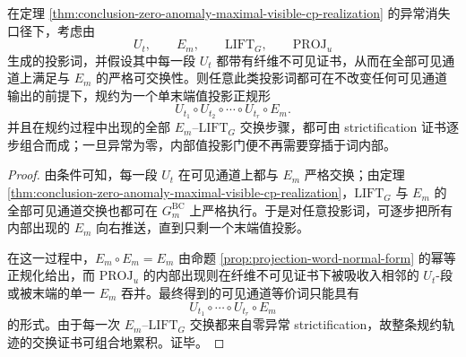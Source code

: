 \begin{theorem}\label{thm:conclusion-strictified-projection-word-terminal-normal-form}
在定理 \ref{thm:conclusion-zero-anomaly-maximal-visible-cp-realization} 的异常消失口径下，考虑由
\[
U_t,\qquad E_m,\qquad \mathrm{LIFT}_G,\qquad \mathrm{PROJ}_u
\]
生成的投影词，并假设其中每一段 \(U_t\) 都带有纤维不可见证书，从而在全部可见通道上满足与 \(E_m\) 的严格可交换性。则任意此类投影词都可在不改变任何可见通道输出的前提下，规约为一个单末端值投影正规形
\[
U_{t_1}\circ U_{t_2}\circ\cdots\circ U_{t_r}\circ E_m.
\]
并且在规约过程中出现的全部 \(E_m\)–\(\mathrm{LIFT}_G\) 交换步骤，都可由 strictification 证书逐步组合而成；一旦异常为零，内部值投影门便不再需要穿插于词内部。
\end{theorem}
\begin{proof}
由条件可知，每一段 \(U_t\) 在可见通道上都与 \(E_m\) 严格交换；由定理 \ref{thm:conclusion-zero-anomaly-maximal-visible-cp-realization}，\(\mathrm{LIFT}_G\) 与 \(E_m\) 的全部可见通道交换也都可在 \(G_m^{\mathrm{BC}}\) 上严格执行。于是对任意投影词，可逐步把所有内部出现的 \(E_m\) 向右推送，直到只剩一个末端值投影。

在这一过程中，\(E_m\circ E_m=E_m\) 由命题 \ref{prop:projection-word-normal-form} 的幂等正规化给出，而 \(\mathrm{PROJ}_u\) 的内部出现则在纤维不可见证书下被吸收入相邻的 \(U_t\)-段或被末端的单一 \(E_m\) 吞并。最终得到的可见通道等价词只能具有
\[
U_{t_1}\circ\cdots\circ U_{t_r}\circ E_m
\]
的形式。由于每一次 \(E_m\)–\(\mathrm{LIFT}_G\) 交换都来自零异常 strictification，故整条规约轨迹的交换证书可组合地累积。证毕。
\end{proof}

